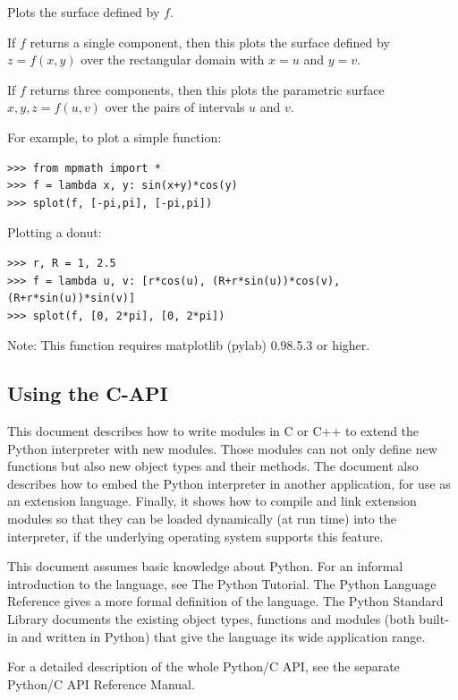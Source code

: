 Plots the surface defined by $f$.

\vpara
If $f$ returns a single component, then this plots the surface defined by $z=f(x,y)$ over the rectangular domain with $x=u$  and $y=v$.

\vpara
If $f$ returns three components, then this plots the parametric surface $x,y,z = f(u,v)$ over the pairs of intervals $u$ and $v$.

\vpara
For example, to plot a simple function:

\begin{lstlisting}
>>> from mpmath import *
>>> f = lambda x, y: sin(x+y)*cos(y)
>>> splot(f, [-pi,pi], [-pi,pi])
\end{lstlisting}


Plotting a donut:

\begin{lstlisting}
>>> r, R = 1, 2.5
>>> f = lambda u, v: [r*cos(u), (R+r*sin(u))*cos(v), (R+r*sin(u))*sin(v)]
>>> splot(f, [0, 2*pi], [0, 2*pi])
\end{lstlisting}


Note: This function requires matplotlib (pylab) 0.98.5.3 or higher.


\subsection{Using the C-API}

This document describes how to write modules in C or C++ to extend the Python interpreter with new modules. Those modules can not only define new functions but also new object types and their methods. The document also describes how to embed the Python interpreter in another application, for use as an extension language. Finally, it shows how to compile and link extension modules so that they can be loaded dynamically (at run time) into the interpreter, if the underlying operating system supports this feature.

This document assumes basic knowledge about Python. For an informal introduction to the language, see The Python Tutorial. The Python Language Reference gives a more formal definition of the language. The Python Standard Library documents the existing object types, functions and modules (both built-in and written in Python) that give the language its wide application range.

For a detailed description of the whole Python/C API, see the separate Python/C API Reference Manual.

